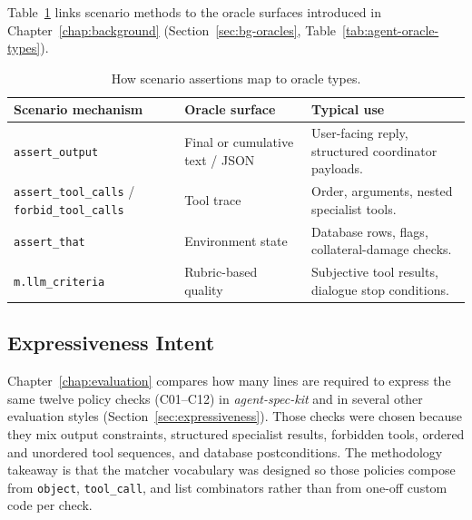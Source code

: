 Table~\ref{tab:assertion-mapping} links scenario methods to the oracle surfaces introduced in Chapter~\ref{chap:background} (Section~\ref{sec:bg-oracles}, Table~\ref{tab:agent-oracle-types}).

\begin{table}[htbp]
\centering
\small
\begin{tabularx}{\textwidth}{p{}p{}X}
\toprule
\textbf{Scenario mechanism} & \textbf{Oracle surface} & \textbf{Typical use} \\
\midrule
\texttt{assert\_output} & Final or cumulative text / JSON &
User-facing reply, structured coordinator payloads. \\
\texttt{assert\_tool\_calls} / \texttt{forbid\_tool\_calls} &
Tool trace &
Order, arguments, nested specialist tools. \\
\texttt{assert\_that} & Environment state &
Database rows, flags, collateral-damage checks. \\
\texttt{m.llm\_criteria} & Rubric-based quality &
Subjective tool results, dialogue stop conditions. \\
\bottomrule
\end{tabularx}
\caption{How scenario assertions map to oracle types.}
\label{tab:assertion-mapping}
\end{table}

\subsection{Expressiveness Intent}

Chapter~\ref{chap:evaluation} compares how many lines are required to express the same twelve policy checks (C01--C12) in \emph{agent-spec-kit} and in several other evaluation styles (Section~\ref{sec:expressiveness}). Those checks were chosen because they mix output constraints, structured specialist results, forbidden tools, ordered and unordered tool sequences, and database postconditions. The methodology takeaway is that the matcher vocabulary was designed so those policies compose from \texttt{object}, \texttt{tool\_call}, and list combinators rather than from one-off custom code per check.
